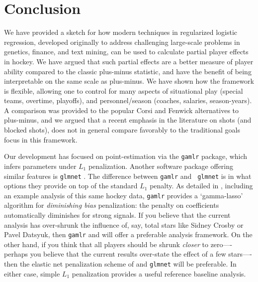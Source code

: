 \section{Conclusion}\label{sec:conclusion}

We have provided a sketch for how modern techniques in regularized logistic
regression, developed originally to address challenging large-scale problems
in genetics, finance, and text mining, can be used to calculate partial player
effects in hockey.  We have argued that such  partial effects are a
better measure of player ability compared to the classic plus-minus statistic,
and have the benefit of being interpretable on the same scale as plus-minus.
 We have shown
how the framework is flexible, allowing one to control for many aspects of
situational play (special teams, overtime, playoffs), and personnel/season
(coaches, salaries, season-years).  A comparison was provided to the popular
Corsi and Fenwick alternatives to plus-minus, and we argued that a recent
emphasis in the literature on shots (and blocked shots), does not in general
compare favorably to the traditional goals focus in this framework.

Our development has focused on point-estimation via the {\tt gamlr} package,
which infers parameters under $L_1$ penalization.  Another software package
offering similar features is {\tt glmnet}
\cite{zou_regularization_2005}.  The difference between {\tt gamlr} and {\tt
glmnet} is in what options they provide on top of the standard $L_1$ penalty.
As detailed in \cite{taddy_one-step_2015}, including an example analysis of
this same hockey data, {\tt gamlr} provides a `gamma-lasso' algorithm for
\textit{diminishing bias} penalization: the penalty on coefficients
automatically diminishes for strong signals.  If you believe that the current
analysis has over-shrunk the influence of, say, total stars like Sidney Crosby
or Pavel Datsyuk, then {\tt gamlr} and \cite{taddy_one-step_2015} will offer a
preferable analysis framework.  On the other hand, if you think that all
players should be shrunk \textit{closer} to zero----perhaps you believe that
the current results over-state the effect of a few stars----then the elastic
net penalization scheme of \cite{zou_regularization_2005} and {\tt glmnet}
will be preferable.  In either case, simple $L_1$ penalization provides a
useful reference baseline analysis.

